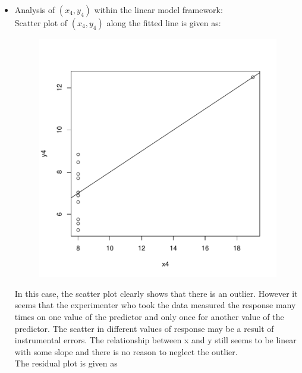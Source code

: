 \documentclass[12pt]{article}
\begin{document}
\begin{itemize}
\item Analysis of $(x_4, y_4)$ within the linear model framework:\\
Scatter plot of $(x_4, y_4)$ along the fitted line is given as:
\begin{figure}[H]
\includegraphics{HW6-028}
\end{figure}
In this case, the scatter plot clearly shows that there is an outlier. However it seems that the experimenter who took the data measured the response many times on one value of the predictor and only once for another value of the predictor. The scatter in different values of response may be a result of instrumental errors. The relationship between x and y still seems to be linear with some slope and there is no reason to neglect the outlier.\\
\clearpage
The residual plot is given as
\begin{figure}[H]

\end{figure}
\end{itemize}
\end{document}
